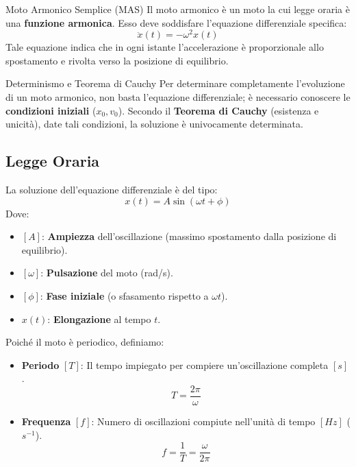 \begin{definizione}{Moto Armonico Semplice (MAS)}
Il moto armonico è un moto la cui legge oraria è una \textbf{funzione armonica}. Esso deve soddisfare l'equazione differenziale specifica:
\begin{equation}
    \ddot{x}(t) = -\omega^2 x(t)
\end{equation}
Tale equazione indica che in ogni istante l'accelerazione è proporzionale allo spostamento e rivolta verso la posizione di equilibrio.
\end{definizione}

\begin{osservazione}{Determinismo e Teorema di Cauchy}
Per determinare completamente l'evoluzione di un moto armonico, non basta l'equazione differenziale; è necessario conoscere le \textbf{condizioni iniziali} ($x_0, v_0$). Secondo il \textbf{Teorema di Cauchy} (esistenza e unicità), date tali condizioni, la soluzione è univocamente determinata.
\end{osservazione}

\subsection{Legge Oraria}
La soluzione dell'equazione differenziale è del tipo:
\begin{equation}
    x(t) = A \sin(\omega t + \phi)
\end{equation}
Dove:
\begin{itemize}
    \item $[A]$: \textbf{Ampiezza} dell'oscillazione (massimo spostamento dalla posizione di equilibrio).
    \item $[\omega]$: \textbf{Pulsazione} del moto (rad/s).
    \item $[\phi]$: \textbf{Fase iniziale} (o sfasamento rispetto a $\omega t$).
    \item $x(t)$: \textbf{Elongazione} al tempo $t$.
\end{itemize}

Poiché il moto è periodico, definiamo:
\begin{itemize}
    \item \textbf{Periodo} $[T]$: Il tempo impiegato per compiere un'oscillazione completa $[s]$.
    \begin{equation}
    T = \frac{2\pi}{\omega}
\end{equation}
    \item \textbf{Frequenza} $[f]$: Numero di oscillazioni compiute nell'unità di tempo $[Hz]$ ($s^{-1}$).
    \begin{equation}
    f = \frac{1}{T} = \frac{\omega}{2\pi}
\end{equation}
\end{itemize}

